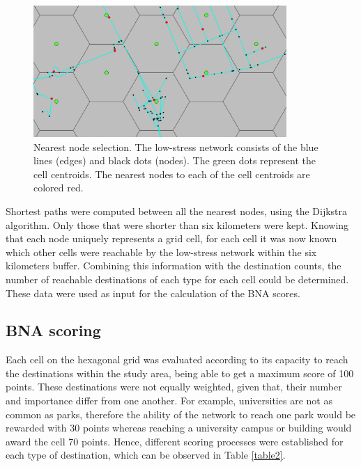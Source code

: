 \documentclass[information,article,submit,moreauthors,Latex,dvi2pdf,10pt,a4paper]{Definitions/mdpi}
\begin{document}
\begin{figure}[ht!]
	\begin{center}
		\captionsetup{justification=centering}
		\includegraphics[height=5cm]{fig2}
		\caption{Nearest node selection. The low-stress network consists of the blue lines (edges) and black dots (nodes). The green dots represent the cell centroids. The nearest nodes to each of the cell centroids are colored red. }
		\label{fig2}
	\end{center}
\end{figure}

Shortest paths were computed between all the nearest nodes, using the Dijkstra algorithm. Only those that were shorter than six kilometers were kept. Knowing that each node uniquely represents a grid cell, for each cell it was now known which other cells were reachable by the low-stress network within the six kilometers buffer. Combining this information with the destination counts, the number of reachable destinations of each type for each cell could be determined. These data were used as input for the calculation of the BNA scores.

\subsection{BNA scoring} \label{score}

Each cell on the hexagonal grid was evaluated according to its capacity to reach the destinations within the study area, being able to get a maximum score of 100 points. These destinations were not equally weighted, given that, their number and importance differ from one another. For example, universities are not as common as parks, therefore the ability of the network to reach one park would be rewarded with 30 points whereas reaching a university campus or building would award the cell 70 points. Hence, different scoring processes were established for each type of destination, which can be observed in Table \ref{table2}.
\end{document}
